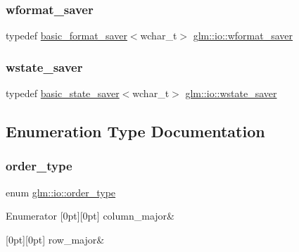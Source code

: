\subsubsection{\texorpdfstring{wformat\+\_\+saver}{wformat\_saver}}
{\footnotesize\ttfamily typedef \hyperlink{classglm_1_1io_1_1basic__format__saver}{basic\+\_\+format\+\_\+saver}$<$wchar\+\_\+t$>$ \hyperlink{namespaceglm_1_1io_a6229ca888648a0ff823eb120f61de481}{glm\+::io\+::wformat\+\_\+saver}}

\mbox{\label{namespaceglm_1_1io_a7a46501fc459c05fa3dc0f2bcbf3e92f}} 
\subsubsection{\texorpdfstring{wstate\+\_\+saver}{wstate\_saver}}
{\footnotesize\ttfamily typedef \hyperlink{classglm_1_1io_1_1basic__state__saver}{basic\+\_\+state\+\_\+saver}$<$wchar\+\_\+t$>$ \hyperlink{namespaceglm_1_1io_a7a46501fc459c05fa3dc0f2bcbf3e92f}{glm\+::io\+::wstate\+\_\+saver}}



\subsection{Enumeration Type Documentation}
\mbox{\label{namespaceglm_1_1io_a3497781803fe594a37177e05ab2a795f}} 
\subsubsection{\texorpdfstring{order\+\_\+type}{order\_type}}
{\footnotesize\ttfamily enum \hyperlink{namespaceglm_1_1io_a3497781803fe594a37177e05ab2a795f}{glm\+::io\+::order\+\_\+type}}

\begin{DoxyEnumFields}{Enumerator}
[0pt][0pt]{}\mbox{\label{namespaceglm_1_1io_a3497781803fe594a37177e05ab2a795faab661780f7f081ee11c34be9b0742229}} 
column\+\_\+major&\\
\hline

[0pt][0pt]{}\mbox{\label{namespaceglm_1_1io_a3497781803fe594a37177e05ab2a795fad080bb2f932ea4078fd0fc10ea1c991c}} 
row\+\_\+major&\\
\hline

\end{DoxyEnumFields}


